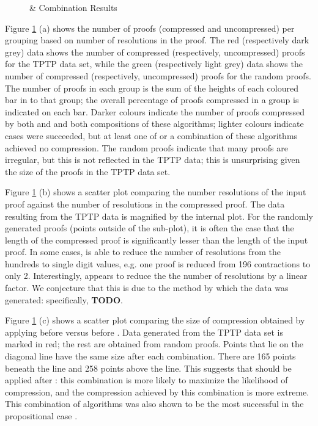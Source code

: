 {\begin{figure}[p]
 \caption{\GFOLU \& \FORPI Combination Results}
\label{fig:ex}

\end{figure}

Figure \ref{fig:ex} (a) shows the number of proofs (compressed and uncompressed) per grouping based on number of resolutions in the proof. The red (respectively dark grey) data shows the number of compressed (respectively, uncompressed) proofs for the TPTP data set, while the green (respectively light grey) data shows the number of compressed (respectively, uncompressed) proofs for the random proofs. The number of proofs in each group is the sum of the heights of each coloured bar in to that group; the overall percentage of proofs compressed in a group is indicated on each bar. Darker colours indicate the number of proofs compressed by both {\FORPI} and {\GFOLU} and both compositions of these algorithms; lighter colours indicate cases were {\FORPI} succeeded, but at least one of {\GFOLU} or a combination of these algorithms achieved no compression. The random proofs indicate that many proofs are irregular, but this is not reflected in the TPTP data; this is unsurprising given the size of the proofs in the TPTP data set.

Figure \ref{fig:ex} (b) shows a scatter plot comparing the number resolutions of the input proof against the number of resolutions in the compressed proof. The data resulting from the TPTP data is magnified by the internal plot. For the randomly generated proofs (points outside of the sub-plot), it is often the case that the length of the compressed proof is significantly lesser than the length of the input proof. In some cases, {\FORPI} is able to reduce the number of resolutions from the hundreds to single digit values, e.g. one proof is reduced from 196 contractions to only 2. Interestingly, {\GFOLU} appears to reduce the the number of resolutions by a linear factor. We conjecture that this is due to the method by which the data was generated: specifically, {\bf TODO}.

Figure \ref{fig:ex} (c) shows a scatter plot comparing the size of compression obtained by applying {\FORPI} before {\GFOLU} versus {\GFOLU} before {\FORPI}. Data generated from the TPTP data set is marked in red; the rest are obtained from random proofs. Points that lie on the diagonal line have the same size after each combination. There are 165 points beneath the line and 258 points above the line. This suggests that {\FORPI} should be applied after {\GFOLU}: this combination is more likely to maximize the likelihood of compression, and the compression achieved by this combination is more extreme. This combination of algorithms was also shown to be the most successful in the propositional case \cite{LURPI}.

}
